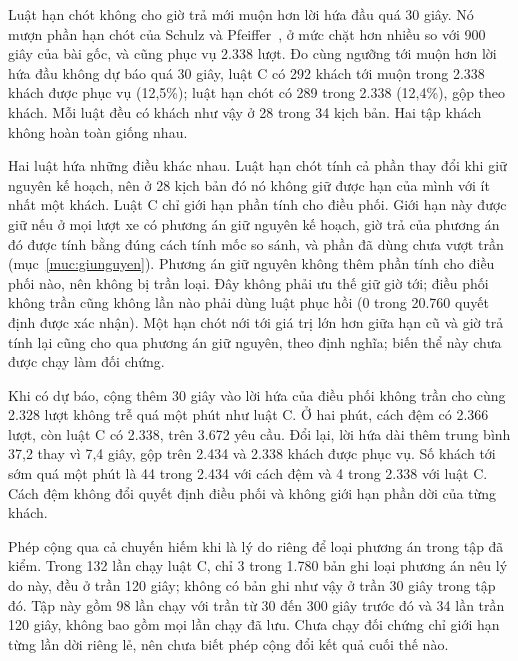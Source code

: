 Luật hạn chót không cho giờ trả mới muộn hơn lời hứa đầu quá 30 giây. Nó mượn phần hạn chót của Schulz và
Pfeiffer~\cite{schulz2026}, ở mức chặt hơn nhiều so với 900 giây của bài gốc, và cũng phục vụ 2.338 lượt.
Đo cùng ngưỡng tới muộn hơn lời hứa đầu không dự báo quá 30 giây, luật C có 292 khách tới muộn trong 2.338 khách được phục vụ
(12,5\%); luật hạn chót có 289 trong 2.338 (12,4\%), gộp theo khách. Mỗi luật đều có khách như vậy
ở 28 trong 34 kịch bản. Hai tập khách không hoàn toàn giống nhau.

Hai luật hứa những điều khác nhau. Luật hạn chót tính cả phần thay đổi khi giữ nguyên kế hoạch, nên ở
28 kịch bản đó nó không giữ được hạn của mình với ít nhất một khách. Luật C chỉ giới hạn phần tính cho
điều phối. Giới hạn này được giữ nếu ở mọi lượt xe có phương án giữ nguyên kế hoạch, giờ trả của phương án
đó được tính bằng đúng cách tính mốc so sánh, và phần đã dùng chưa vượt trần
(mục~\ref{muc:giunguyen}). Phương án giữ nguyên không thêm phần tính cho điều phối nào, nên không bị
trần loại. Đây không phải ưu thế giữ giờ tới; điều phối không trần cũng không lần nào phải dùng luật phục hồi
(0 trong 20.760 quyết định được xác nhận). Một hạn chót nới tới giá trị lớn hơn giữa hạn cũ và giờ
trả tính lại cũng cho qua phương án giữ nguyên, theo định nghĩa; biến thể này chưa được chạy làm đối chứng.

Khi có dự báo, cộng thêm 30 giây vào lời hứa của điều phối không trần cho cùng 2.328 lượt không trễ quá
một phút như luật C. Ở hai phút, cách đệm có 2.366 lượt, còn luật C có 2.338, trên 3.672 yêu cầu.
Đổi lại, lời hứa dài thêm trung bình 37,2 thay vì 7,4 giây, gộp trên 2.434 và 2.338 khách được phục vụ.
Số khách tới sớm quá một phút là 44 trong 2.434 với cách đệm và 4 trong 2.338 với luật C.
Cách đệm không đổi quyết định điều phối và không giới hạn phần dời của từng khách.

Phép cộng qua cả chuyến hiếm khi là lý do riêng để loại phương án trong tập đã kiểm. Trong 132 lần chạy
luật C, chỉ 3 trong 1.780 bản ghi loại phương án nêu lý do này, đều ở trần 120 giây; không có bản ghi
như vậy ở trần 30 giây trong tập đó. Tập này gồm 98 lần chạy với trần từ 30 đến 300 giây trước đó và 34 lần trần 120 giây, không
bao gồm mọi lần chạy đã lưu. Chưa chạy đối chứng chỉ giới hạn từng lần dời riêng lẻ, nên chưa biết
phép cộng đổi kết quả cuối thế nào.


